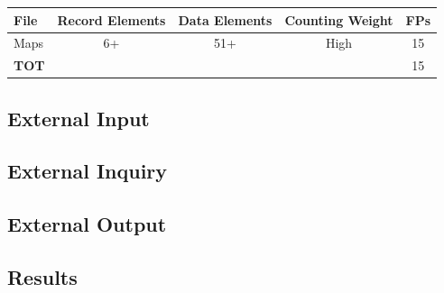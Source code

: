 \begin{table}[h]
    \label{tab:eif}
    \centering

    \begin{tabular}{l|cccc}
    \hline

    \hline
    \textbf{File} & \textbf{Record Elements} & \textbf{Data Elements} & \textbf{Counting Weight} & \textbf{FPs} \\
    \hline
        Maps    &   6+     &   51+     &   High    &   15 \\
    \hline
        \textbf{TOT}    &   &   &   & 15 \\ %
    \hline
        
    \end{tabular}
\end{table}


\subsection{External Input} %
\label{sub:ei}



        
        

\subsection{External Inquiry} %
\label{sub:eiq}

\subsection{External Output} %
\label{sub:eo}

\subsection{Results} %
\label{sub:results}
